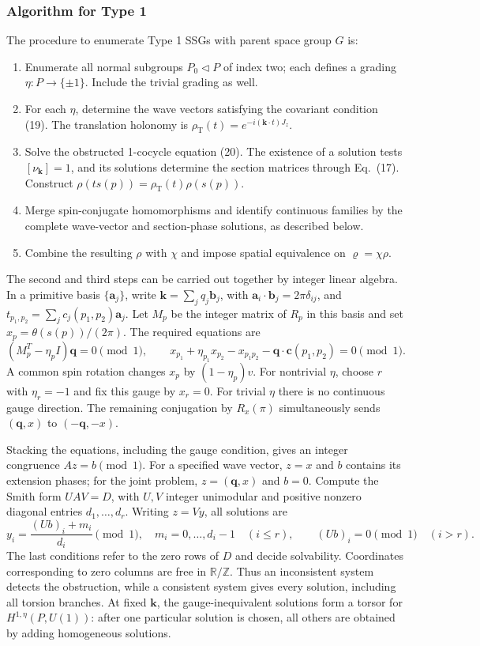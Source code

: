 \documentclass{article}
\begin{document}
\subsubsection{Algorithm for Type 1}

The procedure to enumerate Type 1 SSGs with parent space group $G$ is:
\begin{enumerate}
\renewcommand{\labelenumi}{(\roman{enumi})}
\item Enumerate all normal subgroups $P_0\lhd P$ of index two;
each defines a grading $\eta:P\to\{\pm1\}$. Include the trivial
grading as well.
\item For each $\eta$, determine the wave vectors satisfying the
covariant condition (19). The translation holonomy is
$\rho_{\mathrm T}(t)=e^{-i(\bm k\cdot t)J_z}$.
\item Solve the obstructed 1-cocycle equation (20). The existence of
a solution tests $[\nu_{\bm k}]=1$, and its solutions determine the
section matrices through Eq.~(17). Construct
$\rho(t s(p))=\rho_{\mathrm T}(t)\rho(s(p))$.
\item Merge spin-conjugate homomorphisms and identify continuous
families by the complete wave-vector and section-phase solutions,
as described below.
\item Combine the resulting $\rho$ with $\chi$ and impose spatial
equivalence on $\varrho=\chi\rho$.
\end{enumerate}

The second and third steps can be carried out together by integer
linear algebra. In a primitive basis $\{\bm a_j\}$, write
$\bm k=\sum_j q_j\bm b_j$, with
$\bm a_i\cdot\bm b_j=2\pi\delta_{ij}$, and
$t_{p_1,p_2}=\sum_j c_j(p_1,p_2)\bm a_j$. Let $M_p$ be the
integer matrix of $R_p$ in this basis and set
$x_p=\theta(s(p))/(2\pi)$. The required equations are
\[
 (M_p^T-\eta_p I)\bm q=0\pmod1,\qquad
 x_{p_1}+\eta_{p_1}x_{p_2}-x_{p_1p_2}
       -\bm q\cdot\bm c(p_1,p_2)=0\pmod1.
\]
A common spin rotation changes $x_p$ by $(1-\eta_p)v$.
For nontrivial $\eta$, choose $r$ with $\eta_r=-1$ and fix this
gauge by $x_r=0$. For trivial $\eta$ there is no continuous gauge
direction. The remaining conjugation by $R_x(\pi)$ simultaneously
sends $(\bm q,x)$ to $(-\bm q,-x)$.

Stacking the equations, including the gauge condition, gives an
integer congruence $Az=b\pmod1$. For a specified wave vector,
$z=x$ and $b$ contains its extension phases; for the joint problem,
$z=(\bm q,x)$ and $b=0$. Compute the Smith form $UAV=D$, with
$U,V$ integer unimodular and positive nonzero diagonal entries
$d_1,\ldots,d_r$. Writing $z=Vy$, all solutions are
\[
 y_i=\frac{(Ub)_i+m_i}{d_i}\pmod1,
 \quad m_i=0,\ldots,d_i-1\quad (i\le r),
 \qquad (Ub)_i=0\pmod1\quad(i>r).
\]
The last conditions refer to the zero rows of $D$ and decide
solvability. Coordinates corresponding to zero columns are free in
$\mathbb R/\mathbb Z$. Thus an inconsistent system detects the
obstruction, while a consistent system gives every solution, including
all torsion branches. At fixed $\bm k$, the gauge-inequivalent solutions
form a torsor for $H^{1,\eta}(P,U(1))$: after one particular solution
is chosen, all others are obtained by adding homogeneous solutions.
\end{document}
